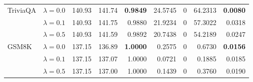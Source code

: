 \begin{table}[t]
{\begin{tabular}{l l rrrrrrr}
\midrule
TriviaQA & $\lambda{=}0.0$ & 140.93 & 141.74 & \textbf{0.9849} & 24.5745 & \cellcolor{cyan!12} $0$ & 64.2313 & \textbf{0.0080} \\
 & $\lambda{=}0.1$ & 140.93 & 141.75 & 0.9880 & 21.9234 & \cellcolor{cyan!12} $0$ & 57.3022 & 0.0318 \\
 & $\lambda{=}0.5$ & 140.93 & 141.59 & 0.9892 & 20.7438 & \cellcolor{cyan!12} $0$ & 54.2189 & 0.0247 \\
\midrule
GSM8K & $\lambda{=}0.0$ & 137.15 & 136.89 & \textbf{1.0000} & 0.2575 & \cellcolor{cyan!12} $0$ & 0.6730 & \textbf{0.0156} \\
 & $\lambda{=}0.1$ & 137.15 & 137.07 & 1.0000 & 0.0721 & \cellcolor{cyan!12} $0$ & 0.1885 & 0.0185 \\
 & $\lambda{=}0.5$ & 137.15 & 137.00 & 1.0000 & 0.1439 & \cellcolor{cyan!12} $0$ & 0.3760 & 0.0190 \\
\bottomrule
\end{tabular}}
\end{table}